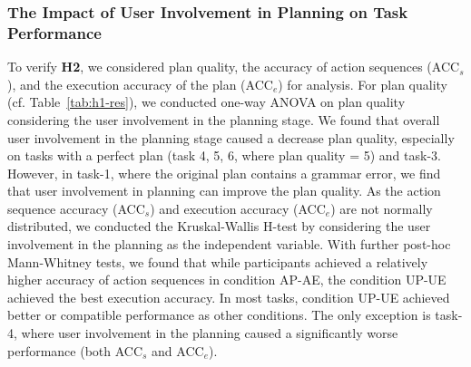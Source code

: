 \subsubsection{The Impact of User Involvement in Planning on Task Performance} \label{sec-exp-h2}
To verify \textbf{H2}, we considered plan quality, the accuracy of action sequences (ACC$_s$), and the execution accuracy of the plan (ACC$_e$) for analysis.
For plan quality (cf. Table~\ref{tab:h1-res}), we conducted one-way ANOVA on plan quality considering the user involvement in the planning stage. 
We found that overall user involvement in the planning stage caused a decrease plan quality, especially on tasks with a perfect plan (\ie task 4, 5, 6, where plan quality = 5) and task-3. 
However, in task-1, where the original plan contains a grammar error, we find that user involvement in planning can improve the plan quality. 
As the action sequence accuracy (ACC$_s$) and execution accuracy (ACC$_e$) are not normally distributed, we conducted the Kruskal-Wallis H-test by considering the user involvement in the planning as the independent variable. 
With further post-hoc Mann-Whitney tests, we found that while participants achieved a relatively higher accuracy of action sequences in condition AP-AE, the condition UP-UE achieved the best execution accuracy. 
In most tasks, condition UP-UE achieved better or compatible performance as other conditions. The only exception is task-4, where user involvement in the planning caused a significantly worse performance (both ACC$_s$ and ACC$_e$). 

